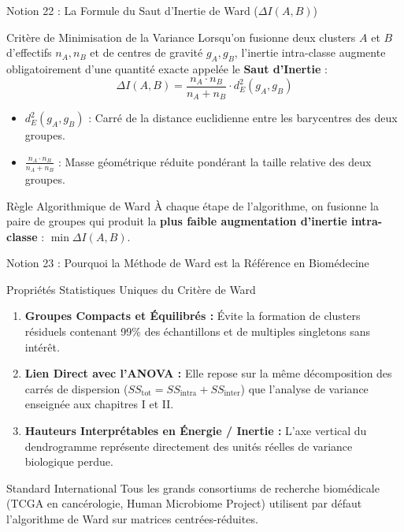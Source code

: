 \documentclass[aspectratio=169,10pt]{beamer}
\begin{document}
\begin{frame}{Notion 22 : La Formule du Saut d'Inertie de Ward ($\Delta I(A, B)$)}
  \begin{conceptbox}{Critère de Minimisation de la Variance}
    \footnotesize
    Lorsqu'on fusionne deux clusters $A$ et $B$ d'effectifs $n_A, n_B$ et de centres de gravité $g_A, g_B$, l'inertie intra-classe augmente obligatoirement d'une quantité exacte appelée le \textbf{Saut d'Inertie} :
    \begin{equation*}
      \Delta I(A, B) = \frac{n_A \cdot n_B}{n_A + n_B} \cdot d_E^2(g_A, g_B)
    \end{equation*}
    \begin{itemize}
      \item $d_E^2(g_A, g_B)$ : Carré de la distance euclidienne entre les barycentres des deux groupes.
      \item $\frac{n_A \cdot n_B}{n_A + n_B}$ : Masse géométrique réduite pondérant la taille relative des deux groupes.
    \end{itemize}
  \end{conceptbox}
  \vspace{1mm}
  \begin{biobox}{Règle Algorithmique de Ward}
    \footnotesize
    À chaque étape de l'algorithme, on fusionne la paire de groupes qui produit la \textbf{plus faible augmentation d'inertie intra-classe} : $\min \Delta I(A, B)$.
  \end{biobox}
\end{frame}

\begin{frame}{Notion 23 : Pourquoi la Méthode de Ward est la Référence en Biomédecine}
  \begin{conceptbox}{Propriétés Statistiques Uniques du Critère de Ward}
    \footnotesize
    \begin{enumerate}
      \item \textbf{Groupes Compacts et Équilibrés :} Évite la formation de clusters résiduels contenant 99\% des échantillons et de multiples singletons sans intérêt.
      \item \textbf{Lien Direct avec l'ANOVA :} Elle repose sur la même décomposition des carrés de dispersion ($SS_{\text{tot}} = SS_{\text{intra}} + SS_{\text{inter}}$) que l'analyse de variance enseignée aux chapitres I et II.
      \item \textbf{Hauteurs Interprétables en Énergie / Inertie :} L'axe vertical du dendrogramme représente directement des unités réelles de variance biologique perdue.
    \end{enumerate}
  \end{conceptbox}
  \vspace{1mm}
  \begin{biobox}{Standard International}
    \footnotesize
    Tous les grands consortiums de recherche biomédicale (TCGA en cancérologie, Human Microbiome Project) utilisent par défaut l'algorithme de Ward sur matrices centrées-réduites.
  \end{biobox}
\end{frame}
\end{document}
